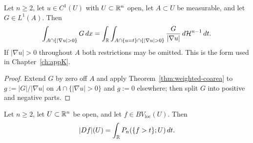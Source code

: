 \begin{corollary}\label{cor:coarea-L1}
Let $n\ge2$, let $u\in C^1(U)$ with $U\subset\mathbb R^n$ open, let $A\subset U$
be measurable, and let $G\in L^1(A)$.  Then
\begin{equation}\label{eq:coarea-L1}
  \int_{A\cap\{|\nabla u|>0\}}G\,dx
  =\int_\R\int_{A\cap\{u=t\}\cap\{|\nabla u|>0\}}
     \frac{G}{|\nabla u|}\,d\Hs^{n-1}\,dt .
\end{equation}
If $|\nabla u|>0$ throughout $A$ both restrictions may be omitted.  This is
the form used in Chapter~\ref{ch:appK}.
\end{corollary}

\begin{proof}
Extend $G$ by zero off $A$ and apply Theorem~\ref{thm:weighted-coarea} to
$g:=|G|/|\nabla u|$ on $A\cap\{|\nabla u|>0\}$ and $g:=0$ elsewhere; then
split $G$ into positive and negative parts.
\end{proof}

\begin{theorem}\label{thm:bv-coarea}
Let $n\ge2$, let $U\subset\mathbb R^n$ be open, and let
$f\in BV_{\mathrm{loc}}(U)$.  Then
\begin{equation}\label{eq:bv-coarea}
  |Df|(U)=\int_\mathbb RP_n(\{f>t\};U)\,dt .
\end{equation}
\end{theorem}

